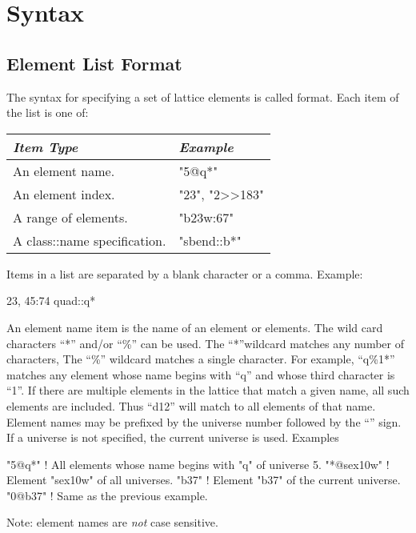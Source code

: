 \chapter{Syntax}
\label{c:syntax}

\section{Element List Format}
\label{s:ele.list.format}

The syntax for specifying a set of lattice elements is called
 format. Each item of the list is one of:
\begin{center}
\begin{tabular}{ll}
  {\it Item Type} & {\it Example} \\ \hline     
  An element name.                                & "5@q*"               \\
  An element index.                               & "23", "2>>183"       \\
  A range of elements.                            & "b23w:67"            \\
  A class::name specification.                    & "sbend::b*"          \\
\end{tabular}
\break

\end{center}
Items in a list are separated by a blank character or a comma. Example:
\begin{example}
  23, 45:74 quad::q*
\end{example}

An element name item is the name of an element or elements. The
wild card characters ``*'' and/or ``\%'' can be used. The ``*''wildcard
matches any number of characters, The ``\%'' wildcard matches a single
character. For example, ``q\%1*'' matches any element whose name
begins with ``q'' and whose third character is ``1''.  If there are
multiple elements in the lattice that match a given name, all such
elements are included. Thus ``d12'' will match to all elements of that
name. Element names may be prefixed by the universe number followed by
the ``\vn{\@}'' sign. If a universe is not specified, the current universe
is used. Examples
\begin{example}
  "5@q*"       ! All elements whose name begins with "q" of universe 5.
  "*@sex10w"   ! Element "sex10w" of all universes.
  "b37"        ! Element "b37" of the current universe.
  "0@b37"      ! Same as the previous example.
\end{example}
Note: element names are {\em not} case sensitive.

